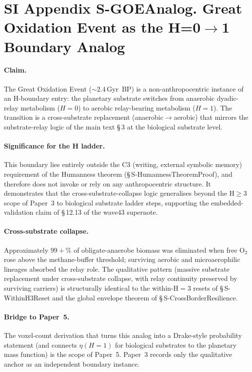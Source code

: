 \documentclass[11pt]{article}
\begin{document}
\section*{SI Appendix S-GOEAnalog. Great Oxidation Event as the H=0$\to$1 Boundary Analog}
\label{sec:S-GOEAnalog}

\paragraph{Claim.} The Great Oxidation Event ($\sim\!2.4$\,Gyr~BP) is a non-anthropocentric instance of an H-boundary entry: the planetary substrate switches from anaerobic dyadic-relay metabolism ($H{=}0$) to aerobic relay-bearing metabolism ($H{=}1$). The transition is a cross-substrate replacement (anaerobic$\to$aerobic) that mirrors the substrate-relay logic of the main text \S\,3 at the biological substrate level.

\paragraph{Significance for the H ladder.} This boundary lies entirely outside the C3 (writing, external symbolic memory) requirement of the Humanness theorem (\S\,S-HumannessTheoremProof), and therefore does not invoke or rely on any anthropocentric structure. It demonstrates that the cross-substrate-collapse logic generalises beyond the H$\geq 3$ scope of Paper~3 to biological substrate ladder steps, supporting the embedded-validation claim of \S\,12.13 of the wave43 supernote.

\paragraph{Cross-substrate collapse.} Approximately $99{+}\%$ of obligate-anaerobe biomass was eliminated when free O$_{2}$ rose above the methane-buffer threshold; surviving aerobic and microaerophilic lineages absorbed the relay role. The qualitative pattern (massive substrate replacement under cross-substrate collapse, with relay continuity preserved by surviving carriers) is structurally identical to the within-H$=3$ resets of \S\,S-WithinH3Reset and the global envelope theorem of \S\,S-CrossBorderResilience.

\paragraph{Bridge to Paper~5.} The voxel-count derivation that turns this analog into a Drake-style probability statement (and connects $\eta(H{=}1)$ for biological substrates to the planetary mass function) is the scope of Paper~5. Paper~3 records only the qualitative anchor as an independent boundary instance.
\end{document}

